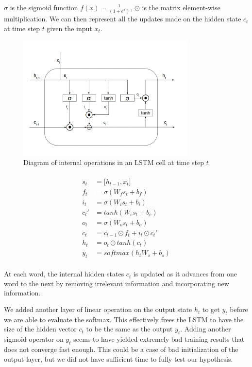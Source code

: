 \documentclass[fyp]{socreport}
\begin{document}
$\sigma$ is the sigmoid function $f(x) = \frac{1}{(1 + e^x)}$, $\odot$ is the
matrix element-wise multiplication. We can then represent all the updates
made on the hidden state $c_t$ at time step $t$ given the input $x_t$.

\clearpage
{
\begin{figure}
    \centering
    \includegraphics[width=0.8\textwidth]{LSTM.png}
    \caption{Diagram of internal operations in an LSTM cell at time step $t$}
\end{figure}

\begin{align*}
  \\
  s_t &= \lbrack h_{t-1}, x_{t} \rbrack \\
  f_t &= \sigma \left( W_f s_t + b_f \right) \\
  i_t &= \sigma \left( W_i s_t + b_i \right) \\
  c_t' &= tanh \left( W_c s_t + b_c \right) \\
  o_t &= \sigma \left( W_o s_t + b_o \right) \\
  c_t &= c_{t-1} \odot f_t + i_t \odot c_t' \\
  h_t &= o_t \odot tanh \left( c_t \right) \\
  y_t &= softmax \left( h_t W_s + b_s \right) \\
\end{align*}
}

At each word, the internal hidden states $c_t$ is updated as it advances from
one word to the next by removing irrelevant information and incorporating
new information.

We added another layer of linear operation on the output state $h_t$ to get
$y_t$ before we are able to evaluate the softmax. This effectively frees the
LSTM to have the size of the hidden vector $c_t$ to be the same as the output
$y_t$. Adding another sigmoid operator on $y_t$ seems to have yielded extremely
bad training results that does not converge fast enough. This could be a case
of bad initialization of the output layer, but we did not have sufficient time
to fully test our hypothesis.
\end{document}
